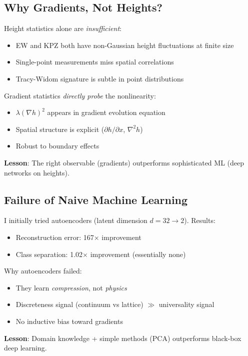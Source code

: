\documentclass[aps,pre,twocolumn,superscriptaddress,showpacs]{revtex4-2}
\begin{document}
\subsection{Why Gradients, Not Heights?}

Height statistics alone are \emph{insufficient}:
\begin{itemize}
\item EW and KPZ both have non-Gaussian height fluctuations at finite size
\item Single-point measurements miss spatial correlations
\item Tracy-Widom signature is subtle in point distributions
\end{itemize}

Gradient statistics \emph{directly probe} the nonlinearity:
\begin{itemize}
\item $\lambda(\nabla h)^2$ appears in gradient evolution equation
\item Spatial structure is explicit ($\partial h/\partial x$, $\nabla^2 h$)
\item Robust to boundary effects
\end{itemize}

\textbf{Lesson}: The right observable (gradients) outperforms sophisticated ML (deep networks on heights).

\subsection{Failure of Naive Machine Learning}

I initially tried autoencoders (latent dimension $d = 32 \to 2$). Results:
\begin{itemize}
\item Reconstruction error: 167$\times$ improvement
\item Class separation: 1.02$\times$ improvement (essentially none)
\end{itemize}

Why autoencoders failed:
\begin{itemize}
\item They learn \emph{compression}, not \emph{physics}
\item Discreteness signal (continuum vs lattice) $\gg$ universality signal
\item No inductive bias toward gradients
\end{itemize}

\textbf{Lesson}: Domain knowledge + simple methods (PCA) outperforms black-box deep learning.
\end{document}
